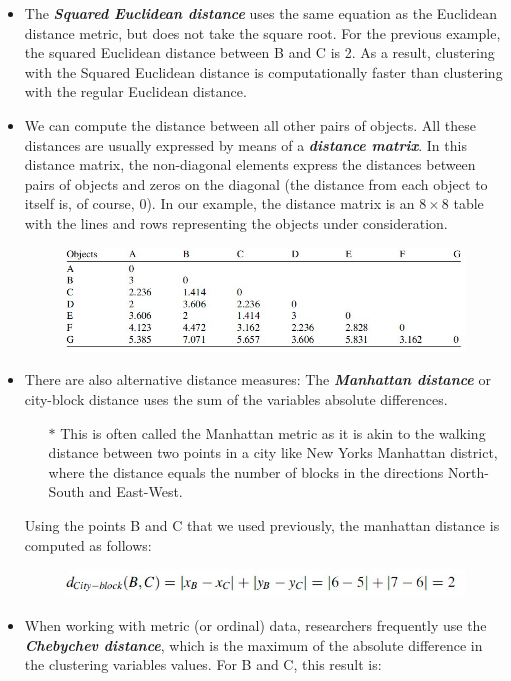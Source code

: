 \documentclass[a4paper,12pt]{article}
\begin{document}
\begin{itemize}
\item  The \textbf{\textit{Squared Euclidean distance}} uses the same equation as the Euclidean distance metric, but does not take the square root. For the previous example, the squared Euclidean distance between B and C is 2.
As a result, clustering with the Squared Euclidean distance is computationally faster than clustering with the regular Euclidean distance.

\item We can compute the distance between all other pairs of objects. All
these distances are usually expressed by means of a \textit{\textbf{distance matrix}}. In this distance
matrix, the non-diagonal elements express the distances between pairs of objects
and zeros on the diagonal (the distance from each object to itself is, of course, 0). In
our example, the distance matrix is an $8 \times 8$ table with the lines and rows
representing the objects under consideration.
\begin{figure}[h!]
	\begin{center}
		\includegraphics[scale=0.6]{images/DistanceMatrix.jpg}
	\end{center}
\end{figure}
\newpage
\item There are also alternative distance measures: The \textbf{\textit{Manhattan distance}} or city-block distance uses the sum of the variables absolute differences.
\begin{itemize}
	\item[$\ast$] This is often called the Manhattan metric
	as it is akin to the walking distance between two points in a city like New Yorks
	Manhattan district, where the distance equals the number of blocks in the directions
	North-South and East-West.
\end{itemize}  Using the points B and C that we used previously, the manhattan distance is computed as follows:
\begin{figure}[h!]
	\begin{center}
		\includegraphics[scale=0.6]{images/Manhattan.jpg}
	\end{center}
\end{figure}
\item When working with metric (or ordinal) data, researchers frequently use
the \textbf{\textit{Chebychev distance}}, which is the maximum of the absolute difference in the
clustering variables values. For B and C, this result is:


\end{itemize}
\end{document}
